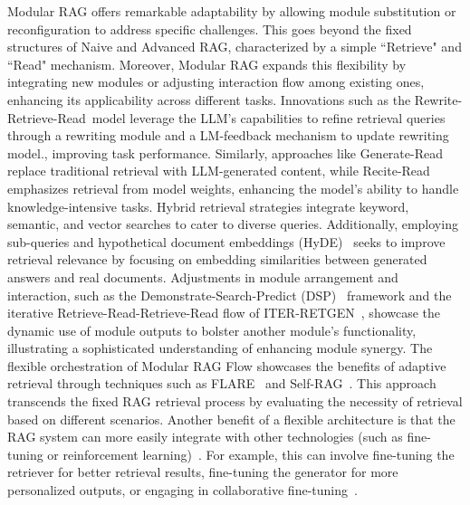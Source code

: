 Modular RAG offers remarkable adaptability by allowing module substitution or reconfiguration to address specific challenges. This goes beyond the fixed structures of Naive and Advanced RAG, characterized by a simple ``Retrieve" and ``Read" mechanism. Moreover, Modular RAG expands this flexibility by integrating new modules or adjusting interaction flow among existing ones, enhancing its applicability across different tasks.
Innovations such as the Rewrite-Retrieve-Read~model leverage the LLM's capabilities to refine retrieval queries through a rewriting module and a LM-feedback mechanism to update rewriting model., improving task performance. Similarly, approaches like Generate-Read~ replace traditional retrieval with LLM-generated content, while Recite-Read~ emphasizes retrieval from model weights, enhancing the model's ability to handle knowledge-intensive tasks. Hybrid retrieval strategies integrate keyword, semantic, and vector searches to cater to diverse queries. Additionally, employing sub-queries and hypothetical document embeddings (HyDE)~ seeks to improve retrieval relevance by focusing on embedding similarities between generated answers and real documents.
Adjustments in module arrangement and interaction, such as the Demonstrate-Search-Predict (DSP)~ framework and the iterative Retrieve-Read-Retrieve-Read flow of ITER-RETGEN~, showcase the dynamic use of module outputs to bolster another module's functionality, illustrating a sophisticated understanding of enhancing module synergy. The flexible orchestration of Modular RAG Flow showcases the benefits of adaptive retrieval through techniques such as FLARE~ and Self-RAG~. This approach transcends the fixed RAG retrieval process by evaluating the necessity of retrieval based on different scenarios. Another benefit of a flexible architecture is that the RAG system can more easily integrate with other technologies (such as fine-tuning or reinforcement learning)~. For example, this can involve fine-tuning the retriever for better retrieval results, fine-tuning the generator for more personalized outputs, or engaging in collaborative fine-tuning~.

